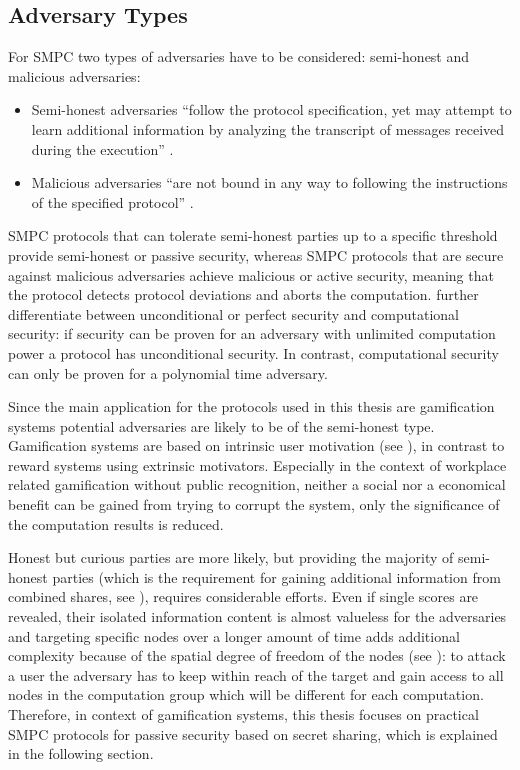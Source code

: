 \subsection{Adversary Types}

For \gls{SMPC} two types of adversaries have to be considered: semi-honest and malicious adversaries:
\begin{itemize}
	\item Semi-honest adversaries ``follow the protocol specification, yet may attempt to learn additional information by analyzing the transcript of messages received during the execution'' \autocite{Aumann2007}.
	\item Malicious adversaries ``are not bound in any way to following the instructions of the specified protocol'' \autocite{Aumann2007}.
\end{itemize}
\gls{SMPC} protocols that can tolerate semi-honest parties up to a specific threshold provide semi-honest or passive security, whereas \gls{SMPC} protocols that are secure against malicious adversaries achieve malicious or active security, meaning that the protocol detects protocol deviations and aborts the computation.
\textcite[p. 82]{Cramer2015} further differentiate between unconditional or perfect security and computational security: if security can be proven for an adversary with unlimited computation power a protocol has unconditional security. In contrast, computational security can only be proven for a polynomial time adversary.

Since the main application for the protocols used in this thesis are gamification systems potential adversaries are likely to be of the semi-honest type. Gamification systems are based on intrinsic user motivation (see ), in contrast to reward systems using extrinsic motivators. Especially in the context of workplace related gamification without public recognition, neither a social nor a economical benefit can be gained from trying to corrupt the system, only the significance of the computation results is reduced.

Honest but curious parties are more likely, but providing the majority of semi-honest parties (which is the requirement for gaining additional information from combined shares, see ), requires considerable efforts. Even if single scores are revealed, their isolated information content is almost valueless for the adversaries and targeting specific nodes over a longer amount of time adds additional complexity because of the spatial degree of freedom of the nodes (see ): to attack a user the adversary has to keep within reach of the target and gain access to all nodes in the computation group which will be different for each computation.
Therefore, in context of gamification systems, this thesis focuses on practical \gls{SMPC} protocols for passive security based on secret sharing, which is explained in the following section.

